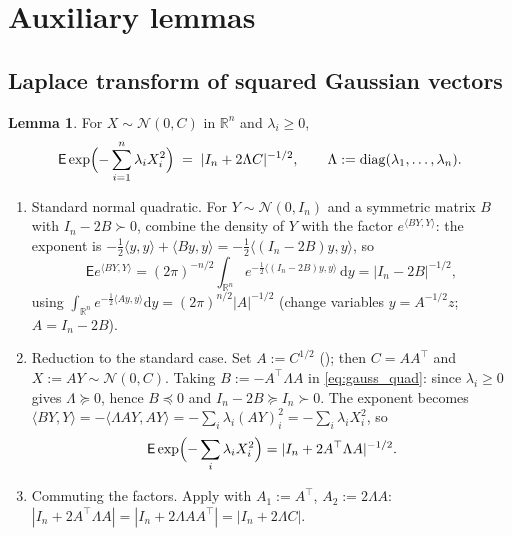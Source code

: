 \documentclass[14pt]{extarticle}
\makeatletter
\theoremstyle{definition}
\newtheorem{lemma}[theorem]{Lemma}
\renewenvironment{proof}[1][\proofname]{\par
  \pushQED{\qed}%
  \normalfont \topsep6\p@\@plus6\p@\relax
  \trivlist
  \item[\hskip\labelsep\bfseries #1\@addpunct{.}]\ignorespaces
}{%
  \popQED\endtrivlist\@endpefalse
}
\newcommand{\R}{\mathbb{R}}
\newcommand{\EE}{\mathsf{E}}
\newcommand{\diag}{\operatorname{diag}}
\newcommand{\dd}{\mathrm{d}}
\newcommand{\caln}{\mathcal{N}}
\makeatother
\begin{document}
\section{Auxiliary lemmas}\label{sec:lemmas}

\subsection{Laplace transform of squared Gaussian vectors}

\begin{lemma}\label{lem:Lap}
  For $X\sim\caln(0,C)$ in $\R^n$ and $\lambda_i\geqslant 0$,
  \[
    \EE\exp\Bigl(-\sum_{i=1}^n\lambda_iX_i^2\Bigr)
    \;=\;|I_n+2\Lambda C|^{-1/2},
    \qquad\Lambda:=\diag(\lambda_1,\ldots,\lambda_n).
  \]
\end{lemma}

\begin{proof}
  \leavevmode
  \begin{enumerate}
    \item Standard normal quadratic.  For $Y\sim\caln(0,I_n)$ and a
      symmetric matrix $B$ with $I_n-2B\succ 0$, combine the density of
      $Y$ with the factor $e^{\langle BY,Y\rangle}$: the exponent is
      $-\tfrac12\langle y,y\rangle+\langle By,y\rangle
      =-\tfrac12\langle(I_n-2B)y,y\rangle$, so
      \begin{equation}\label{eq:gauss_quad}
        \EE e^{\langle BY,Y\rangle}
        =(2\pi)^{-n/2}\int_{\R^n}e^{-\frac12\langle(I_n-2B)y,y\rangle}\,\dd y
        =|I_n-2B|^{-1/2},
      \end{equation}
      using $\int_{\R^n}e^{-\frac12\langle Ay,y\rangle}\dd y=(2\pi)^{n/2}|A|^{-1/2}$
      (change variables $y=A^{-1/2}z$; $A=I_n-2B$).

    \item Reduction to the standard case.  Set $A:=C^{1/2}$
      (); then $C=AA^\top$ and $X:=AY\sim\caln(0,C)$.
      Taking $B:=-A^\top\Lambda A$ in \eqref{eq:gauss_quad}: since
      $\lambda_i\geqslant 0$ gives $\Lambda\succcurlyeq 0$, hence $B\preccurlyeq 0$
      and $I_n-2B\succcurlyeq I_n\succ 0$.  The exponent becomes
      $\langle BY,Y\rangle=-\langle\Lambda AY,AY\rangle
      =-\sum_i\lambda_i(AY)_i^2=-\sum_i\lambda_iX_i^2$, so
      \[
        \EE\exp\Bigl(-\sum_i\lambda_iX_i^2\Bigr)
        =|I_n+2A^\top\Lambda A|^{-1/2}.
      \]

    \item Commuting the factors.  Apply  with
      $A_1:=A^\top$, $A_2:=2\Lambda A$:
      $|I_n+2A^\top\Lambda A|=|I_n+2\Lambda AA^\top|=|I_n+2\Lambda C|$.
  \end{enumerate}
\end{proof}
\end{document}
